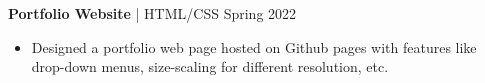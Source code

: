 \documentclass[11pt]{article}       %
\begin{document}
\textbf{Portfolio Website} | HTML/CSS \hfill Spring 2022 \\
\vspace{-9pt}
\begin{itemize}
    \item Designed a portfolio web page hosted on Github pages with features like drop-down menus, size-scaling for different resolution, etc.

\end{itemize}

\vspace{-18.5pt}
\end{document}
